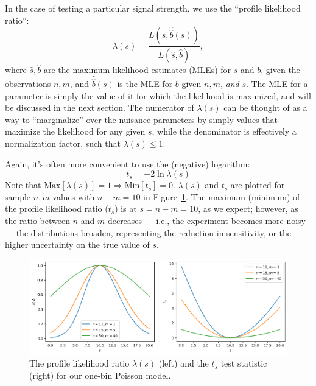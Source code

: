 In the case of testing a particular signal strength, we use the ``profile likelihood ratio'':
\begin{equation}
\label{eq:03_plr}
\lambda(s) = \frac{L(s, \hat{\hat{b}}(s))}{L(\hat{s}, \hat{b})},
\end{equation}
where $\hat{s}, \hat{b}$ are the maximum-likelihood estimates (MLEs) for $s$ and $b$, given the observations $n, m$, and $\hat{\hat{b}}(s)$ is the MLE for $b$ given $n, m$, \textit{and} $s$.
The MLE for a parameter is simply the value of it for which the likelihood is maximized, and will be discussed in the next section.
The numerator of $\lambda(s)$ can be thought of as a way to ``marginalize'' over the nuisance parameters by simply values that maximize the likelihood for any given $s$, while the denominator is effectively a normalization factor, such that $\lambda(s) \leq 1$.

Again, it's often more convenient to use the (negative) logarithm:
\begin{equation}
\label{eq:03_ts}
t_s = -2 \ln \lambda(s)
\end{equation}
Note that $\mathrm{Max}[\lambda(s)] = 1 \Rightarrow \mathrm{Min}[t_s] = 0$.
$\lambda(s)$ and $t_s$ are plotted for sample $n, m$ values with $n - m = 10$ in Figure~\ref{fig:03_plr}.
The maximum (minimum) of the profile likelihood ratio ($t_s$) is at $s = n - m = 10$, as we expect; however, as the ratio between $n$ and $m$ decreases --- i.e., the experiment becomes more noisy --- the distributions broaden, representing the reduction in sensitivity, or the higher uncertainty on the true value of $s$.

\begin{figure}[htb]
    \centering
    \includegraphics[width=\textwidth]{figures/03-Stats/01-intro/2.png}
    \caption{The profile likelihood ratio $\lambda(s)$ (left) and the $t_s$ test statistic (right) for our one-bin Poisson model.}
    \label{fig:03_plr}
\end{figure}

